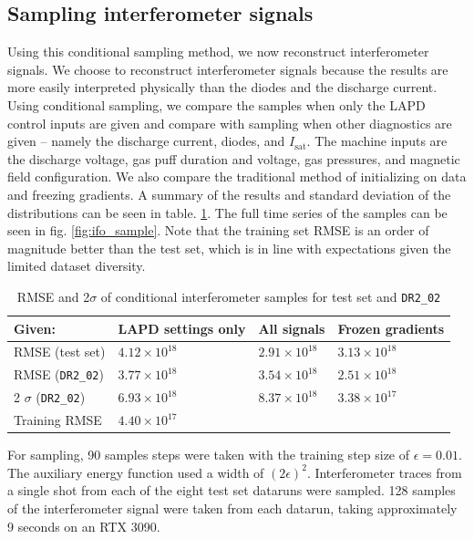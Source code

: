 \subsection{Sampling interferometer signals}

Using this conditional sampling method, we now reconstruct interferometer signals. We choose to reconstruct interferometer signals because the results are more easily interpreted physically than the diodes and the discharge current. Using conditional sampling, we compare the samples when only the LAPD control inputs are given and compare with sampling when other diagnostics are given -- namely the discharge current, diodes, and $I_\text{sat}$. The machine inputs are the discharge voltage, gas puff duration and voltage, gas pressures, and magnetic field configuration. We also compare the traditional method of initializing on data and freezing gradients. A summary of the results and standard deviation of the distributions can be seen in table. \ref{tab:ifo-cond-sample}. The full time series of the samples can be seen in fig. \ref{fig:ifo_sample}. Note that the training set RMSE is an order of magnitude better than the test set, which is in line with expectations given the limited dataset diversity.

\begin{table}
\small
	\centering
	\caption{RMSE and 2$\sigma$ of conditional interferometer samples for test set and \texttt{DR2\_02}}
	\label{tab:ifo-cond-sample}
	\begin{tabular}{l l l l}
		Given: & LAPD settings only & All signals & Frozen gradients \\
		\hline
		RMSE (test set) & $4.12 \times 10^{18}$ & $2.91 \times 10^{18}$ & $3.13 \times 10^{18}$ \\
		RMSE (\texttt{DR2\_02})& $3.77 \times 10^{18}$ & $3.54 \times 10^{18}$ & $2.51 \times 10^{18}$ \\
		2 $\sigma$ (\texttt{DR2\_02}) & $6.93 \times 10^{18}$ & $8.37 \times 10^{18}$ & $3.38 \times 10^{17}$ \\
		\hline
		Training RMSE & $4.40 \times 10^{17}$ \\
	\end{tabular}
\end{table}

For sampling, 90 samples steps were taken with the training step size of $\epsilon=0.01$. The auxiliary energy function used a width of $(2\epsilon)^2$. Interferometer traces from a single shot from each of the eight test set dataruns were sampled. 128 samples of the interferometer signal were taken from each datarun, taking approximately 9 seconds on an RTX 3090. 

